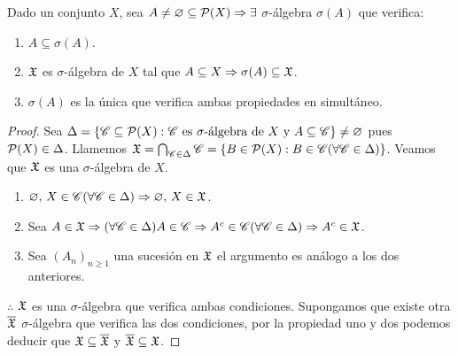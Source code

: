 \begin{prop}
    Dado un conjunto $X$, sea $A \neq \varnothing \subseteq \mathcal{P}(X) \Rightarrow \exists$ $\sigma$-álgebra $\sigma(A)$ que verifica: \begin{enumerate}
        \item $A \subseteq \sigma(A)$.
        \item $\mathfrak{X}$ es $\sigma$-álgebra de $X$ tal que $A \subseteq X \Rightarrow \sigma(A) \subseteq \mathfrak{X}$.
        \item $\sigma(A)$ es la única que verifica ambas propiedades en simultáneo.
    \end{enumerate}

    \begin{proof}
        Sea $\Delta = \{ \mathscr{C} \subseteq \mathcal{P}(X) : \mathscr{C} \text{ es } \sigma \text{-álgebra de } X \text{ y } A \subseteq \mathscr{C} \} \neq \varnothing$ pues $\mathcal{P}(X) \in \Delta$.
        Llamemos $\mathfrak{X} = \bigcap_{\mathscr{C} \in \Delta} \mathscr{C} = \{ B \in \mathcal{P}(X) : B \in \mathscr{C} (\forall \mathscr{C} \in \Delta) \}$.
        Veamos que $\mathfrak{X}$ es una $\sigma$-álgebra de $X$.
        \begin{enumerate}
            \item $\varnothing\text{, } X \in \mathscr{C} (\forall \mathscr{C} \in \Delta) \Rightarrow \varnothing\text{, } X \in \mathfrak{X}$.
            \item Sea $A \in \mathfrak{X} \Rightarrow (\forall \mathscr{C} \in \Delta) A \in \mathscr{C} \Rightarrow A^c \in \mathscr{C} (\forall \mathscr{C} \in \Delta) \Rightarrow A^c \in \mathfrak{X}$.
            \item Sea $(A_n)_{n \geq 1}$ una sucesión en $\mathfrak{X}$ el argumento es análogo a los dos anteriores.
        \end{enumerate}
        $\therefore$ $\mathfrak{X}$ es una $\sigma$-álgebra que verifica ambas condiciones.
        Supongamos que existe otra $\overline{\mathfrak{X}}$ $\sigma$-álgebra que verifica las dos condiciones, por la propiedad uno y dos podemos deducir que $\mathfrak{X} \subseteq \overline{\mathfrak{X}}$ y $\overline{\mathfrak{X}} \subseteq \mathfrak{X}$.
    \end{proof}
\end{prop}

